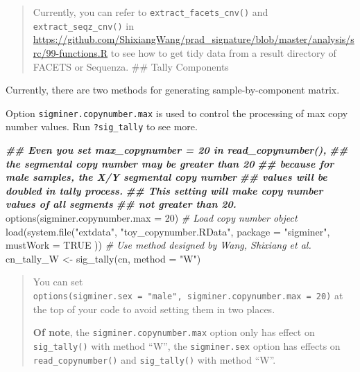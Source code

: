 \documentclass[
  12pt,
  a4paper,
  twoside]{book}
\newenvironment{Shaded}{\begin{snugshade}}{\end{snugshade}}
\newcommand{\AttributeTok}[1]{\textcolor[rgb]{0.77,0.63,0.00}{#1}}
\newcommand{\CommentTok}[1]{\textcolor[rgb]{0.56,0.35,0.01}{\textit{#1}}}
\newcommand{\ConstantTok}[1]{\textcolor[rgb]{0.00,0.00,0.00}{#1}}
\newcommand{\DecValTok}[1]{\textcolor[rgb]{0.00,0.00,0.81}{#1}}
\newcommand{\DocumentationTok}[1]{\textcolor[rgb]{0.56,0.35,0.01}{\textbf{\textit{#1}}}}
\newcommand{\FunctionTok}[1]{\textcolor[rgb]{0.00,0.00,0.00}{#1}}
\newcommand{\NormalTok}[1]{#1}
\newcommand{\OtherTok}[1]{\textcolor[rgb]{0.56,0.35,0.01}{#1}}
\newcommand{\StringTok}[1]{\textcolor[rgb]{0.31,0.60,0.02}{#1}}
\begin{document}
\begin{quote}
Currently, you can refer to \texttt{extract\_facets\_cnv()} and \texttt{extract\_seqz\_cnv()} in \url{https://github.com/ShixiangWang/prad_signature/blob/master/analysis/src/99-functions.R} to
see how to get tidy data from a result directory of FACETS or Sequenza.
\#\# Tally Components
\end{quote}

Currently, there are two methods for generating sample-by-component matrix.

Option \texttt{sigminer.copynumber.max} is used to control the processing of max copy number values. Run \texttt{?sig\_tally} to see more.

\begin{Shaded}
\begin{Highlighting}[]
\DocumentationTok{\#\# Even you set max\_copynumber = 20 in read\_copynumber(),}
\DocumentationTok{\#\# the segmental copy number may be greater than 20}
\DocumentationTok{\#\# because for male samples, the X/Y segmental copy number}
\DocumentationTok{\#\# values will be doubled in tally process.}
\DocumentationTok{\#\# This setting will make copy number values of all segments}
\DocumentationTok{\#\# not greater than 20.}
\FunctionTok{options}\NormalTok{(}\AttributeTok{sigminer.copynumber.max =} \DecValTok{20}\NormalTok{)}
\CommentTok{\# Load copy number object}
\FunctionTok{load}\NormalTok{(}\FunctionTok{system.file}\NormalTok{(}\StringTok{"extdata"}\NormalTok{, }\StringTok{"toy\_copynumber.RData"}\NormalTok{,}
  \AttributeTok{package =} \StringTok{"sigminer"}\NormalTok{, }\AttributeTok{mustWork =} \ConstantTok{TRUE}
\NormalTok{))}
\CommentTok{\# Use method designed by Wang, Shixiang et al.}
\NormalTok{cn\_tally\_W }\OtherTok{\textless{}{-}} \FunctionTok{sig\_tally}\NormalTok{(cn, }\AttributeTok{method =} \StringTok{"W"}\NormalTok{)}
\end{Highlighting}
\end{Shaded}

\begin{quote}
You can set \texttt{options(sigminer.sex\ =\ "male",\ sigminer.copynumber.max\ =\ 20)} at the top of your code
to avoid setting them in two places.

\textbf{Of note}, the \texttt{sigminer.copynumber.max} option only has effect on \texttt{sig\_tally()} with method ``W'',
the \texttt{sigminer.sex} option has effects on \texttt{read\_copynumber()} and \texttt{sig\_tally()} with method ``W''.
\end{quote}
\end{document}
